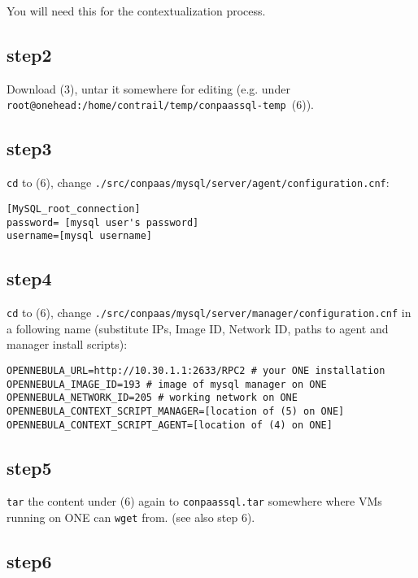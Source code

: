 \documentclass[a4paper,10pt]{article}
\begin{document}
You will need this for the contextualization process.

\subsection*{step2} 

Download (3), untar it somewhere for editing (e.g. under \\ {\tt root@onehead:/home/contrail/temp/conpaassql-temp }(6)).

\subsection*{step3}

{\tt cd} to (6), change {\tt ./src/conpaas/mysql/server/agent/configuration.cnf}:

\begin{Verbatim}[frame=single]
[MySQL_root_connection]
password= [mysql user's password]
username=[mysql username]
\end{Verbatim}

\subsection*{step4}

{\tt cd} to (6), change {\tt ./src/conpaas/mysql/server/manager/configuration.cnf} in a following name (substitute IPs, Image ID, Network ID, paths to agent and manager install scripts):

\begin{Verbatim}[frame=single]
OPENNEBULA_URL=http://10.30.1.1:2633/RPC2 # your ONE installation
OPENNEBULA_IMAGE_ID=193 # image of mysql manager on ONE
OPENNEBULA_NETWORK_ID=205 # working network on ONE
OPENNEBULA_CONTEXT_SCRIPT_MANAGER=[location of (5) on ONE]
OPENNEBULA_CONTEXT_SCRIPT_AGENT=[location of (4) on ONE]
\end{Verbatim}

\subsection*{step5}

{\tt tar} the content under (6) again to {\tt conpaassql.tar} somewhere where VMs running on ONE can {\tt wget} from. (see also step 6). 

\subsection*{step6}
\end{document}

